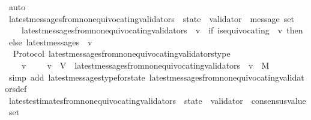 \begin{isabellebody}
\ auto%
\endisatagproof
{\isafoldproof}%
%
\isadelimproof
\isanewline
%
\endisadelimproof
\isanewline
\isanewline
\isanewline
\isanewline
\isanewline
{}\isamarkupfalse%
\ latest{\isacharunderscore}messages{\isacharunderscore}from{\isacharunderscore}non{\isacharunderscore}equivocating{\isacharunderscore}validators\ {\isacharcolon}{\isacharcolon}\ {\isachardoublequoteopen}state\ {\isasymRightarrow}\ validator\ {\isasymRightarrow}\ message\ set{\isachardoublequoteclose}\isanewline
\ \ \isanewline
\ \ \ \ {\isachardoublequoteopen}latest{\isacharunderscore}messages{\isacharunderscore}from{\isacharunderscore}non{\isacharunderscore}equivocating{\isacharunderscore}validators\ {\isasymsigma}\ v\ {\isacharequal}\ {\isacharparenleft}if\ is{\isacharunderscore}equivocating\ {\isasymsigma}\ v\ then\ {\isasymemptyset}\ else\ latest{\isacharunderscore}messages\ {\isasymsigma}\ v{\isacharparenright}{\isachardoublequoteclose}\isanewline
\isanewline
{}\isamarkupfalse%
\ {\isacharparenleft}\ Protocol{\isacharparenright}\ latest{\isacharunderscore}messages{\isacharunderscore}from{\isacharunderscore}non{\isacharunderscore}equivocating{\isacharunderscore}validators{\isacharunderscore}type\ {\isacharcolon}\isanewline
\ \ {\isachardoublequoteopen}{\isasymforall}\ {\isasymsigma}\ v{\isachardot}\ {\isasymsigma}\ {\isasymin}\ {\isasymSigma}\ {\isasymand}\ v\ {\isasymin}\ V\ {\isasymlongrightarrow}\ latest{\isacharunderscore}messages{\isacharunderscore}from{\isacharunderscore}non{\isacharunderscore}equivocating{\isacharunderscore}validators\ {\isasymsigma}\ v\ {\isasymsubseteq}\ M{\isachardoublequoteclose}\isanewline
%
\isadelimproof
\ \ %
\endisadelimproof
%
\isatagproof
{}\isamarkupfalse%
\ {\isacharparenleft}simp\ add{\isacharcolon}\ latest{\isacharunderscore}messages{\isacharunderscore}type{\isacharunderscore}for{\isacharunderscore}state\ latest{\isacharunderscore}messages{\isacharunderscore}from{\isacharunderscore}non{\isacharunderscore}equivocating{\isacharunderscore}validators{\isacharunderscore}def{\isacharparenright}%
\endisatagproof
{\isafoldproof}%
%
\isadelimproof
\isanewline
%
\endisadelimproof
\isanewline
\isanewline
\isanewline
\isanewline
\isanewline
{}\isamarkupfalse%
\ latest{\isacharunderscore}estimates{\isacharunderscore}from{\isacharunderscore}non{\isacharunderscore}equivocating{\isacharunderscore}validators\ {\isacharcolon}{\isacharcolon}\ {\isachardoublequoteopen}state\ {\isasymRightarrow}\ validator\ {\isasymRightarrow}\ consensus{\isacharunderscore}value\ set{\isachardoublequoteclose}\isanewline

\end{isabellebody}
